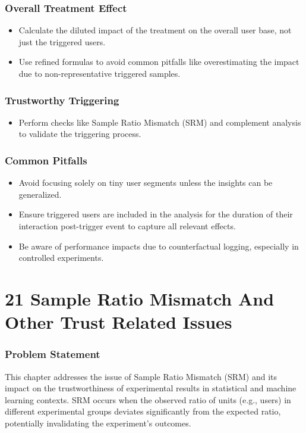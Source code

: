 \documentclass{article}
\begin{document}
\subsubsection*{Overall Treatment Effect}
\begin{itemize}
    \item Calculate the diluted impact of the treatment on the overall user base, not just the triggered users.
    \item Use refined formulas to avoid common pitfalls like overestimating the impact due to non-representative triggered samples.
\end{itemize}

\subsubsection*{Trustworthy Triggering}
\begin{itemize}
    \item Perform checks like Sample Ratio Mismatch (SRM) and complement analysis to validate the triggering process.
\end{itemize}

\subsubsection*{Common Pitfalls}
\begin{itemize}
    \item Avoid focusing solely on tiny user segments unless the insights can be generalized.
    \item Ensure triggered users are included in the analysis for the duration of their interaction post-trigger event to capture all relevant effects.
    \item Be aware of performance impacts due to counterfactual logging, especially in controlled experiments.
\end{itemize}

\section*{21 Sample Ratio Mismatch And Other Trust Related Issues}
\subsubsection*{Problem Statement}
This chapter addresses the issue of Sample Ratio Mismatch (SRM) and its impact on the trustworthiness of experimental results in statistical and machine learning contexts. SRM occurs when the observed ratio of units (e.g., users) in different experimental groups deviates significantly from the expected ratio, potentially invalidating the experiment's outcomes.
\end{document}

